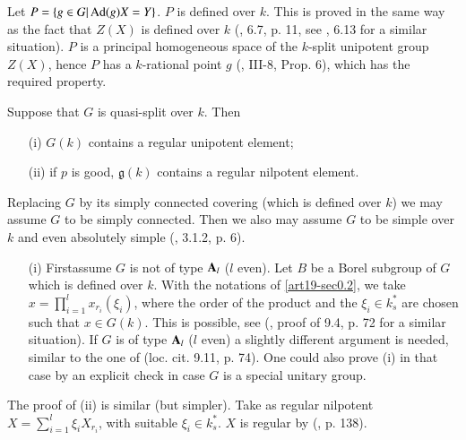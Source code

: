 Let $P=\{g\in G|\operatorname{\mathrm{Ad}} (g)X=Y\}$. $P$ is defined over $k$. This is proved in the same way as the fact that $Z(X)$ is defined over $k$ (\cite{art19-key10}, 6.7, p. 11, see \cite{art19-key2}, 6.13 for a similar situation). $P$ is a principal homogeneous space of the $k$-split unipotent group $Z(X)$, hence $P$ has a $k$-rational point $g$ (\cite{art19-key13}, III-8, Prop. 6), which has the required property.

\begin{proposition}\label{art19-prop3.4}
Suppose that $G$ is quasi-split over $k$. Then 
\begin{itemize}
\item[\rm(i)] $G(k)$ contains a regular unipotent element;

\item[\rm(ii)] if $p$ is good, $\mathfrak{g}(k)$ contains a regular nilpotent element.
\end{itemize}
\end{proposition}

Replacing $G$ by its simply connected covering (which is defined over $k$) we may assume $G$ to be simply connected. Then we also may assume $G$ to be simple over $k$ and even absolutely simple (\cite{art19-key18}, 3.1.2, p. 6).
\begin{itemize}
\item[(i)] First\pageoriginale assume $G$ is not of type $\mathbf{A}_{l}$ ($l$ even). Let $B$ be a Borel subgroup of $G$ which is defined over $k$. With the notations of \ref{art19-sec0.2}, we take $x=\prod\limits^{l}_{i=1}x_{r_{i}}(\xi_{i})$, where the order of the product and the $\xi_{i}\in k^{*}_{s}$ are chosen such that $x\in G(k)$. This is possible, see (\cite{art19-key15}, proof of 9.4, p. 72 for a similar situation). If $G$ is of type $\mathbf{A}_{l}$ ($l$ even) a slightly different argument is needed, similar to the one of (loc. cit. 9.11, p. 74). One could also prove (i) in that case by an explicit check in case $G$ is a special unitary group.
\end{itemize}

The proof of (ii) is similar (but simpler). Take as regular nilpotent $X=\sum\limits^{l}_{i=1}\xi_{i}X_{r_{i}}$, with suitable $\xi_{i}\in k^{*}_{s}$. $X$ is regular by (\cite{art19-key14}, p. 138).

